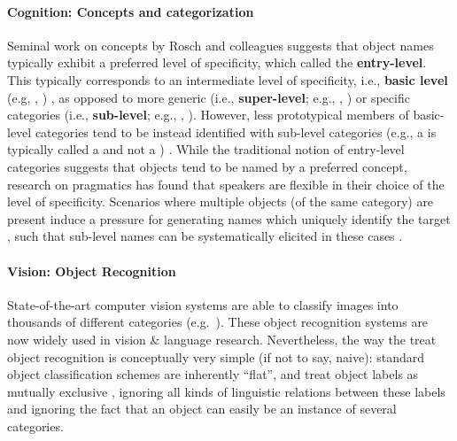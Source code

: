 \paragraph{Cognition: Concepts and categorization}

 Seminal work on concepts by Rosch and colleagues suggests that object names typically exhibit a preferred level of specificity, which \citet{jolicoeur1984pictures} called the \textbf{entry-level}. This typically corresponds to an intermediate level of specificity, i.e., \textbf{basic level} (e.g, , ) \cite{rosch1976basic}, as opposed to more generic (i.e., \textbf{super-level}; e.g., , ) or specific categories (i.e., \textbf{sub-level}; e.g., , ). However, less prototypical members of basic-level categories tend to be instead identified with sub-level categories (e.g., a  is typically called a  and not a ) \cite{jolicoeur1984pictures}. 
While the traditional notion of entry-level categories suggests that objects tend to be named by a  preferred concept, research on pragmatics has found that speakers are flexible in  
their choice of the level of specificity. 
Scenarios where multiple objects (of the same category) are present induce a pressure for generating names which uniquely identify the target \cite{olson1970language}, such that sub-level names can be systematically elicited in these cases %
\cite{rohde2012communicating,graf2016animal}.

\paragraph{Vision: Object Recognition}

State-of-the-art computer vision systems are able to classify images into thousands of different categories (e.g.\  ). These object recognition systems are now widely used in vision \& language research.
Nevertheless, the way the treat object recognition is conceptually very simple (if not to say, naive):  standard object classification schemes are inherently ``flat'', and treat object labels as mutually exclusive \cite{deng2014large}, ignoring all kinds of linguistic relations between these labels and ignoring the fact that an object can easily be an instance of several categories. 


